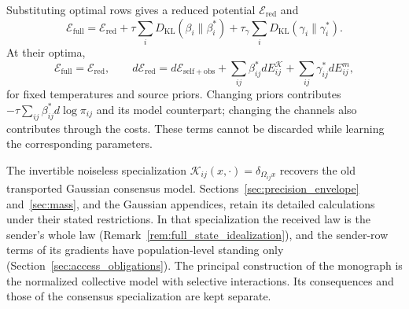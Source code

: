 Substituting optimal rows gives a reduced potential $\mathcal E_{\mathrm{red}}$ and
\begin{equation}
\mathcal E_{\mathrm{full}}
=\mathcal E_{\mathrm{red}}
+\tau\sum_iD_{\mathrm{KL}}(\beta_i\|\beta_i^*)
+\tau_\gamma\sum_iD_{\mathrm{KL}}(\gamma_i\|\gamma_i^*).
\label{eq:attention_full_reduced_identity}
\end{equation}
At their optima,
\begin{equation}
\mathcal E_{\mathrm{full}}=\mathcal E_{\mathrm{red}},\qquad
d\mathcal E_{\mathrm{red}}
=d\mathcal E_{\mathrm{self+obs}}
+\sum_{ij}\beta_{ij}^*dE_{ij}^{\mathcal K}
+\sum_{ij}\gamma_{ij}^*dE_{ij}^{m},
\label{eq:attention_full_equals_reduced}
\end{equation}
for fixed temperatures and source priors. Changing priors contributes
$-\tau\sum_{ij}\beta_{ij}^*d\log\pi_{ij}$ and its model counterpart; changing the channels also contributes through the costs. These terms cannot be discarded while learning the corresponding parameters.

The invertible noiseless specialization
$\mathcal K_{ij}(x,\cdot)=\delta_{\Omega_{ij}x}$ recovers the old transported Gaussian consensus model. Sections~\ref{sec:precision_envelope} and~\ref{sec:mass}, and the Gaussian appendices, retain its detailed calculations under their stated restrictions. In that specialization the received law is the sender's whole law (Remark~\ref{rem:full_state_idealization}), and the sender-row terms of its gradients have population-level standing only (Section~\ref{sec:access_obligations}). The principal construction of the monograph is the normalized collective model with selective interactions. Its consequences and those of the consensus specialization are kept separate.

